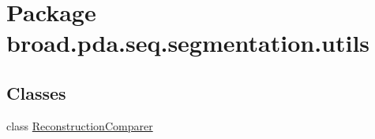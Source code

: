 \hypertarget{namespacebroad_1_1pda_1_1seq_1_1segmentation_1_1utils}{\section{Package broad.\+pda.\+seq.\+segmentation.\+utils}
\label{namespacebroad_1_1pda_1_1seq_1_1segmentation_1_1utils}
}
\subsection*{Classes}
\begin{DoxyCompactItemize}
\item 
class \hyperlink{classbroad_1_1pda_1_1seq_1_1segmentation_1_1utils_1_1_reconstruction_comparer}{Reconstruction\+Comparer}
\end{DoxyCompactItemize}
